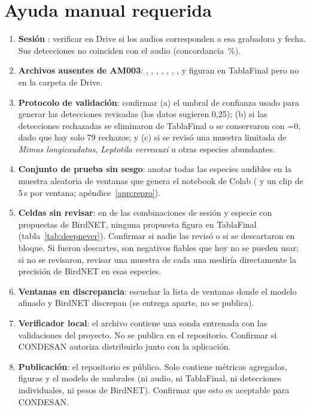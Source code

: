 \documentclass[11pt,a4paper]{article}
\newcommand{\spp}[1]{\textit{#1}}
\begin{document}
\section{Ayuda manual requerida}\label{sec:ayuda}
\begin{enumerate}
  \item \textbf{Sesión }: verificar en Drive si los audios corresponden a esa grabadora y fecha. Sus detecciones no coinciden
        con el audio (concordancia \qcExcludedAgreement\,\%).
  \item \textbf{Archivos ausentes de AM003}: , , , ,
        , , ,  y  figuran en TablaFinal pero no
        en la carpeta de Drive.
  \item \textbf{Protocolo de validación}: confirmar (a) el umbral de confianza usado para generar las detecciones revisadas (los datos sugieren 0,25);
        (b) si las detecciones rechazadas se eliminaron de TablaFinal o se conservaron con =0, dado que hay solo 79 rechazos;
        y (c) si se revisó una muestra limitada de \spp{Mimus longicaudatus}, \spp{Leptotila verreauxi} u otras especies abundantes.
  \item \textbf{Conjunto de prueba sin sesgo}: anotar todas las especies audibles en la muestra aleatoria de ventanas que genera el notebook de Colab
        ( y un clip de 5\,s por ventana; apéndice~\ref{app:repro}).
  \item \textbf{Celdas sin revisar}: en \deepCellsNever{} de las \deepCellsTotal{} combinaciones de sesión y especie con propuestas de BirdNET, ninguna propuesta figura en
        TablaFinal (tabla~\ref{tab:deepnever}). Confirmar si nadie las revisó o si se descartaron en bloque. Si fueron descartes, son negativos fiables
        que hoy no se pueden usar; si no se revisaron, revisar una muestra de cada una mediría directamente la precisión de BirdNET en esas especies.
  \item \textbf{Ventanas en discrepancia}: escuchar la lista de ventanas donde el modelo afinado y BirdNET discrepan (se entrega aparte, no se publica).
  \item \textbf{Verificador local}: el archivo  contiene una sonda entrenada con las validaciones del proyecto. No se publica en
        el repositorio. Confirmar si CONDESAN autoriza distribuirlo junto con la aplicación.
  \item \textbf{Publicación}: el repositorio es público. Solo contiene métricas agregadas, figuras y el modelo de umbrales (ni audio, ni TablaFinal, ni
        detecciones individuales, ni pesos de BirdNET). Confirmar que esto es aceptable para CONDESAN.
\end{enumerate}
\end{document}
